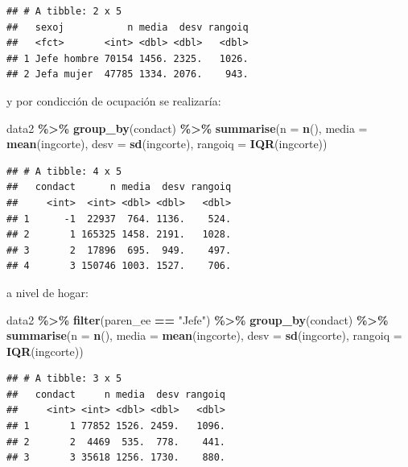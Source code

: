 \documentclass[
  spanish,
  12pt,
]{book}
\newenvironment{Shaded}{\begin{snugshade}}{\end{snugshade}}
\newcommand{\AttributeTok}[1]{\textcolor[rgb]{0.13,0.29,0.53}{#1}}
\newcommand{\FunctionTok}[1]{\textcolor[rgb]{0.13,0.29,0.53}{\textbf{#1}}}
\newcommand{\NormalTok}[1]{#1}
\newcommand{\SpecialCharTok}[1]{\textcolor[rgb]{0.81,0.36,0.00}{\textbf{#1}}}
\newcommand{\StringTok}[1]{\textcolor[rgb]{0.31,0.60,0.02}{#1}}
\begin{document}
\begin{verbatim}
## # A tibble: 2 x 5
##   sexoj           n media  desv rangoiq
##   <fct>       <int> <dbl> <dbl>   <dbl>
## 1 Jefe hombre 70154 1456. 2325.   1026.
## 2 Jefa mujer  47785 1334. 2076.    943.
\end{verbatim}

y por condicción de ocupación se realizaría:

\begin{Shaded}
\begin{Highlighting}[]
\NormalTok{data2 }\SpecialCharTok{\%\textgreater{}\%} \FunctionTok{group\_by}\NormalTok{(condact) }\SpecialCharTok{\%\textgreater{}\%}
  \FunctionTok{summarise}\NormalTok{(}\AttributeTok{n =} \FunctionTok{n}\NormalTok{(),}
            \AttributeTok{media =} \FunctionTok{mean}\NormalTok{(ingcorte),}
            \AttributeTok{desv =} \FunctionTok{sd}\NormalTok{(ingcorte),}
            \AttributeTok{rangoiq =} \FunctionTok{IQR}\NormalTok{(ingcorte))}
\end{Highlighting}
\end{Shaded}

\begin{verbatim}
## # A tibble: 4 x 5
##   condact      n media  desv rangoiq
##     <int>  <int> <dbl> <dbl>   <dbl>
## 1      -1  22937  764. 1136.    524.
## 2       1 165325 1458. 2191.   1028.
## 3       2  17896  695.  949.    497.
## 4       3 150746 1003. 1527.    706.
\end{verbatim}

a nivel de hogar:

\begin{Shaded}
\begin{Highlighting}[]
\NormalTok{data2 }\SpecialCharTok{\%\textgreater{}\%} \FunctionTok{filter}\NormalTok{(paren\_ee }\SpecialCharTok{==} \StringTok{"Jefe"}\NormalTok{) }\SpecialCharTok{\%\textgreater{}\%} 
  \FunctionTok{group\_by}\NormalTok{(condact) }\SpecialCharTok{\%\textgreater{}\%}
  \FunctionTok{summarise}\NormalTok{(}\AttributeTok{n =} \FunctionTok{n}\NormalTok{(),}
            \AttributeTok{media =} \FunctionTok{mean}\NormalTok{(ingcorte),}
            \AttributeTok{desv =} \FunctionTok{sd}\NormalTok{(ingcorte),}
            \AttributeTok{rangoiq =} \FunctionTok{IQR}\NormalTok{(ingcorte))}
\end{Highlighting}
\end{Shaded}

\begin{verbatim}
## # A tibble: 3 x 5
##   condact     n media  desv rangoiq
##     <int> <int> <dbl> <dbl>   <dbl>
## 1       1 77852 1526. 2459.   1096.
## 2       2  4469  535.  778.    441.
## 3       3 35618 1256. 1730.    880.
\end{verbatim}
\end{document}
